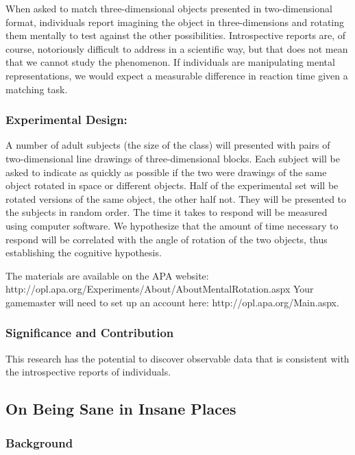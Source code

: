 When asked to match three-dimensional objects presented in two-dimensional format, individuals report imagining the object in three-dimensions and rotating them mentally to test against the other possibilities. Introspective reports are, of course, notoriously difficult to address in a scientific way, but that does not mean that we cannot study the phenomenon. If individuals are manipulating mental representations, we would expect a measurable difference in reaction time given a matching task.

\subsubsection{Experimental Design:}
\label{experimentaldesign:}

A number of adult subjects (the size of the class) will presented with pairs of two-dimensional line drawings of three-dimensional blocks. Each subject will be asked to indicate as quickly as possible if the two were drawings of the same object rotated in space or different objects. Half of the experimental set will be rotated versions of the same object, the other half not. They will be presented to the subjects in random order. The time it takes to respond will be measured using computer software. We hypothesize that the amount of time necessary to respond will be correlated with the angle of rotation of the two objects, thus establishing the cognitive hypothesis.

The materials are available on the APA website: http:\slash \slash opl.apa.org\slash Experiments\slash About\slash AboutMentalRotation.aspx Your gamemaster will need to set up an account here: http:\slash \slash opl.apa.org\slash Main.aspx.

\subsubsection{Significance and Contribution}
\label{significanceandcontribution}

This research has the potential to discover observable data that is consistent with the introspective reports of individuals.

\newpage

\subsection{On Being Sane in Insane Places}
\label{onbeingsaneininsaneplaces}

\subsubsection{Background}
\label{background}

